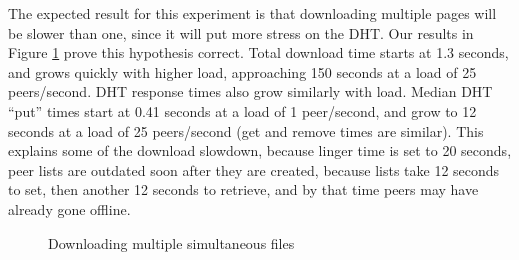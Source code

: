 The expected result for this experiment is that downloading multiple pages will be slower than one, 
since it will put more stress on the DHT.  Our results in Figure \ref{fig:multiple_files} prove
this hypothesis correct.  Total download time starts at 1.3 seconds, and grows quickly with higher load, approaching 
150 seconds at a load of 25 peers/second. DHT response times also grow similarly with load.  Median DHT ``put'' times start 
at 0.41 seconds at a load of 1 peer/second, and grow to 12 seconds at a load of 25 peers/second (get and remove times are similar).
This explains some of the download slowdown, because linger time is set to 20 seconds, peer lists are outdated soon after they are created, because
lists take 12 seconds to set, then another 12 seconds to retrieve, and by that time peers may have already gone offline.


\begin{figure}\begin{center} 
 \label{fig:multiple_files}
    \caption[]{Downloading multiple simultaneous files}
    \end{center}
    \end{figure}


